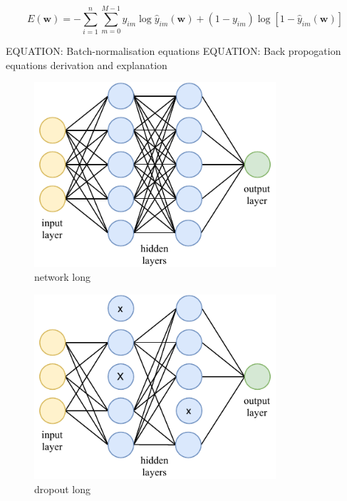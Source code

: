 \begin{equation} %
    E(\boldsymbol{w})=
    -\displaystyle\sum_{i=1}^{n}\displaystyle\sum_{m=0}^{M-1}y_{im}\log\hat{y}_{im}(\boldsymbol{w})+
    (1-y_{im})\log[1-\hat{y}_{im}(\boldsymbol{w})]
\end{equation} %

EQUATION: Batch-normalisation equations
EQUATION: Back propogation equations derivation and explanation

\begin{figure} %
    \includegraphics[width=0.8\textwidth]{diagrams/6-cvn/network.pdf}
    \caption[network short]
    {network long}
    \label{fig:network}
\end{figure} %

\begin{figure} %
    \includegraphics[width=0.8\textwidth]{diagrams/6-cvn/dropout.pdf}
    \caption[dropout short]
    {dropout long}
    \label{fig:dropout}
\end{figure} %

